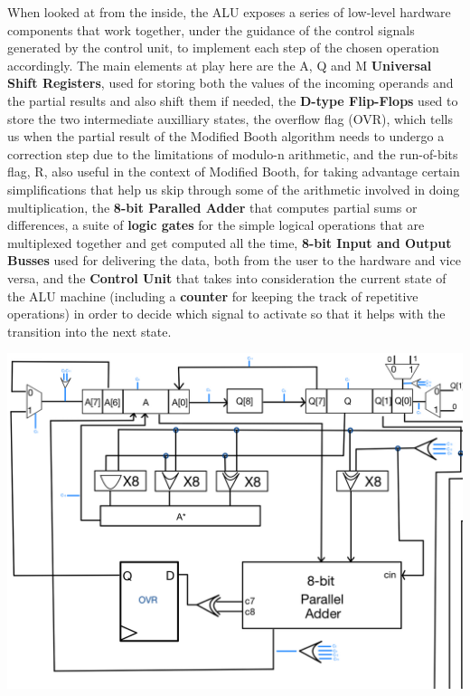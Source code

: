 \documentclass[12pt, letterpaper]{article}
\begin{document}
When looked at from the inside, the ALU exposes a series of low-level hardware components that work together, under the guidance of the control signals
generated by the control unit, to implement each step of the chosen operation accordingly. The main elements at play here are the A, Q and M
\textbf{Universal Shift Registers}, used for storing both the values of the incoming operands and the partial results and also shift them if needed, the
\textbf{D-type Flip-Flops} used to store the two intermediate auxilliary states, the overflow flag (OVR), which tells us when the partial result of the
Modified Booth algorithm needs to undergo a correction step due to the limitations of modulo-n arithmetic, and the run-of-bits flag, R, also useful in
the context of Modified Booth, for taking advantage certain simplifications that help us skip through some of the arithmetic involved in doing multiplication,
the \textbf{8-bit Paralled Adder} that computes partial sums or differences, a suite of \textbf{logic gates} for the simple logical operations that are
multiplexed together and get computed all the time, \textbf{8-bit Input and Output Busses} used for delivering the data, both from the user to the hardware
and vice versa, and the \textbf{Control Unit} that takes into consideration the current state of the ALU machine (including a
\textbf{counter} for keeping the track of repetitive operations) in order to decide which signal to activate so that it helps with the transition into the next state.

\begin{center}
\includegraphics[scale=0.3]{Documentation/ALU_1}
\end{center}
\end{document}
